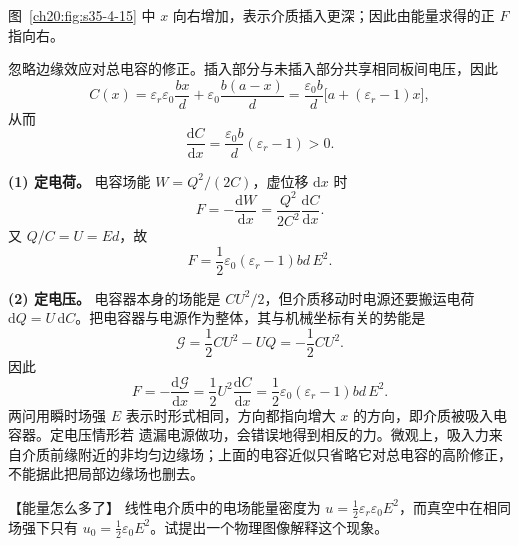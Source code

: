 {图~\ref{ch20:fig:s35-4-15} 中 $x$ 向右增加，表示介质插入更深；因此由能量求得的正 $F$ 指向右。

\par\noindent\begin{minipage}{\linewidth}
\dielectricInsertionFigure
{}\label{ch20:fig:s35-4-15}
\end{minipage}\par\medskip

\begin{xesolution}
\ThAInsertion

忽略边缘效应对总电容的修正。插入部分与未插入部分共享相同板间电压，因此
\[
 C(x)=\varepsilon_r\varepsilon_0\frac{bx}{d}
      +\varepsilon_0\frac{b(a-x)}d
 =\frac{\varepsilon_0b}{d}\bigl[a+(\varepsilon_r-1)x\bigr],
\]
从而
\[
 \frac{\mathrm dC}{\mathrm dx}
 =\frac{\varepsilon_0b}{d}(\varepsilon_r-1)>0.
\]

\textbf{(1) 定电荷。} 电容场能 $W=Q^2/(2C)$，虚位移 $\mathrm dx$ 时
\[
 F=-\frac{\mathrm dW}{\mathrm dx}
 =\frac{Q^2}{2C^2}\frac{\mathrm dC}{\mathrm dx}.
\]
又 $Q/C=U=Ed$，故
\[
 \boxed{F=\frac12\varepsilon_0(\varepsilon_r-1)b d\,E^2}.
\]

\textbf{(2) 定电压。} 电容器本身的场能是 $CU^2/2$，但介质移动时电源还要搬运电荷
$\mathrm dQ=U\,\mathrm dC$。把电容器与电源作为整体，其与机械坐标有关的势能是
\[
 \mathcal G=\frac12CU^2-UQ=-\frac12CU^2.
\]
因此
\[
 F=-\frac{\mathrm d\mathcal G}{\mathrm dx}
 =\frac12U^2\frac{\mathrm dC}{\mathrm dx}
 =\boxed{\frac12\varepsilon_0(\varepsilon_r-1)b d\,E^2}.
\]
两问用瞬时场强 $E$ 表示时形式相同，方向都指向增大 $x$ 的方向，即介质被吸入电容器。定电压情形若
遗漏电源做功，会错误地得到相反的力。微观上，吸入力来自介质前缘附近的非均匀边缘场；上面的电容近似只省略它对总电容的高阶修正，不能据此把局部边缘场也删去。
\end{xesolution}



\begin{origexamplebox}{【能量怎么多了】}\label{ch20:ex:s35-4-7}
线性电介质中的电场能量密度为
$u=\tfrac12\varepsilon_r\varepsilon_0E^2$，而真空中在相同场强下只有
$u_0=\tfrac12\varepsilon_0E^2$。试提出一个物理图像解释这个现象。

\ThQPolarizationEnergy
\end{origexamplebox}\par\nopagebreak[4]



\begin{xesolution}
\par\noindent\begin{minipage}{\linewidth}
\polarizationEnergyFigure
{}
\end{minipage}\par\medskip
\ThAPolarizationEnergy


\end{xesolution}}
